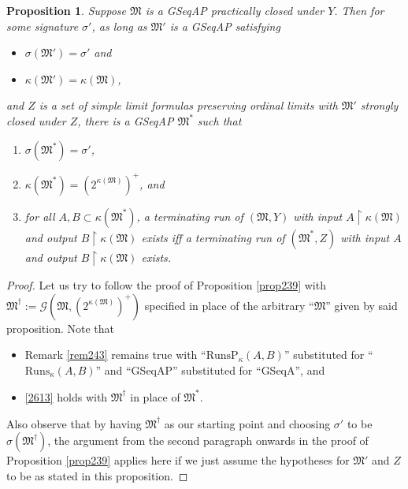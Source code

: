 \documentclass[12pt, twoside]{memoir}
\numberwithin{equation}{section}
\newtheorem{prop}[thm]{Proposition}
\theoremstyle{definition}
\theoremstyle{remark}
\theoremstyle{definition}
\theoremstyle{definition}
\theoremstyle{definition}
\theoremstyle{remark}
\begin{document}
\begin{prop}\label{prop261}
Suppose $\mathfrak{M}$ is a GSeqAP practically closed under $Y$. Then for some signature $\sigma'$, as long as $\mathfrak{M}'$ is a GSeqAP satisfying
\begin{itemize}
    \item $\sigma(\mathfrak{M}') = \sigma'$ and
    \item $\kappa(\mathfrak{M}') = \kappa(\mathfrak{M})$,
\end{itemize}
and $Z$ is a set of simple limit formulas preserving ordinal limits with $\mathfrak{M}'$ strongly closed under $Z$, there is a GSeqAP $\mathfrak{M}^*$ such that
\begin{enumerate}[label=(\alph*)]
    \item $\sigma(\mathfrak{M}^*) = \sigma'$,
    \item $\kappa(\mathfrak{M}^*) = (2^{\kappa(\mathfrak{M})})^+$, and
    \item\label{2613} for all $A, B \subset \kappa(\mathfrak{M}^*)$, a terminating run of $(\mathfrak{M}, Y)$ with input $A \restriction \kappa(\mathfrak{M})$ and output $B \restriction \kappa(\mathfrak{M})$ exists iff a terminating run of $(\mathfrak{M}^*, Z)$ with input $A$ and output $B \restriction \kappa(\mathfrak{M})$ exists.
\end{enumerate}
\end{prop}

\begin{proof}
Let us try to follow the proof of Proposition \ref{prop239} with $\mathfrak{M}^{\dagger} := \mathcal{G}(\mathfrak{M}, (2^{\kappa(\mathfrak{M})})^+)$ specified in place of the arbitrary ``$\mathfrak{M}$'' given by said proposition. Note that 
\begin{itemize}
    \item Remark \ref{rem243} remains true with ``$\mathrm{RunsP}_{\kappa}(A, B)$'' substituted for ``$\mathrm{Runs}_{\kappa}(A, B)$'' and ``GSeqAP'' substituted for ``GSeqA'', and 
    \item \ref{2613} holds with $\mathfrak{M}^{\dagger}$ in place of $\mathfrak{M}^*$.
\end{itemize}
Also observe that by having $\mathfrak{M}^{\dagger}$ as our starting point and choosing $\sigma'$ to be $\sigma(\mathfrak{M}^{\dagger})$, the argument from the second paragraph onwards in the proof of Proposition \ref{prop239} applies here if we just assume the hypotheses for $\mathfrak{M}'$ and $Z$ to be as stated in this proposition. 
\end{proof}
\end{document}
